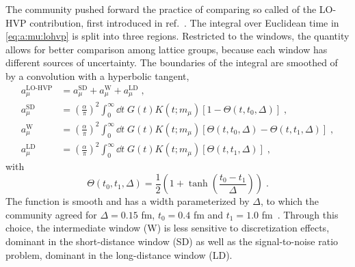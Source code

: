 The community pushed forward the practice of comparing so called  of the LO-HVP contribution, first introduced in ref.~\cite{Lehner:2017kuc,RBC_2018}.
The integral over Euclidean time in \cref{eq:a:mu:lohvp} is split into three regions.
Restricted to the windows, the quantity allows for better comparison among lattice groups, because each window has different sources of uncertainty.
The boundaries of the integral are smoothed of by a convolution with a hyperbolic tangent,
\begin{align} \label{eq:a:mu:lohvp:windows}
a_{\mu}^{\text{LO-HVP}} &= a_{\mu}^{\text{SD}} + a_{\mu}^{\text{W}} + a_{\mu}^{\text{LD}} \;, \\
a_{\mu}^{\text{SD}} &=
\left( \frac{\alpha}{\pi} \right)^{2} \int_{0}^{\infty} \dd t \; G(t) K(t; m_{\mu}) \left[ 1 - \Theta(t, t_0, \Delta) \right] \;, \\
a_{\mu}^{\text{W}} &=
\left( \frac{\alpha}{\pi} \right)^{2} \int_{0}^{\infty} \dd t \; G(t) K(t; m_{\mu}) \left[ \Theta(t, t_0, \Delta) - \Theta(t, t_1, \Delta) \right] \;, \\
a_{\mu}^{\text{LD}} &=
\left( \frac{\alpha}{\pi} \right)^{2} \int_{0}^{\infty} \dd t \; G(t) K(t; m_{\mu}) \left[ \Theta(t, t_1, \Delta) \right] \;,
\end{align}
with
\begin{equation}
\Theta(t_0, t_1, \Delta) = \frac{1}{2} \left( 1 + \tanh\left( \frac{t_0 - t_1}{\Delta} \right) \right) \;.
\end{equation}
The function is smooth and has a width parameterized by $\Delta$, to which the community agreed for $\Delta = 0.15$ fm, $t_0 = 0.4$ fm and $t_1 = 1.0$ fm~\cite{RBC_2018}.
Through this choice, the intermediate window (W) is less sensitive to discretization effects, dominant in the short-distance window (SD) as well as the signal-to-noise ratio problem, dominant in the long-distance window (LD).


